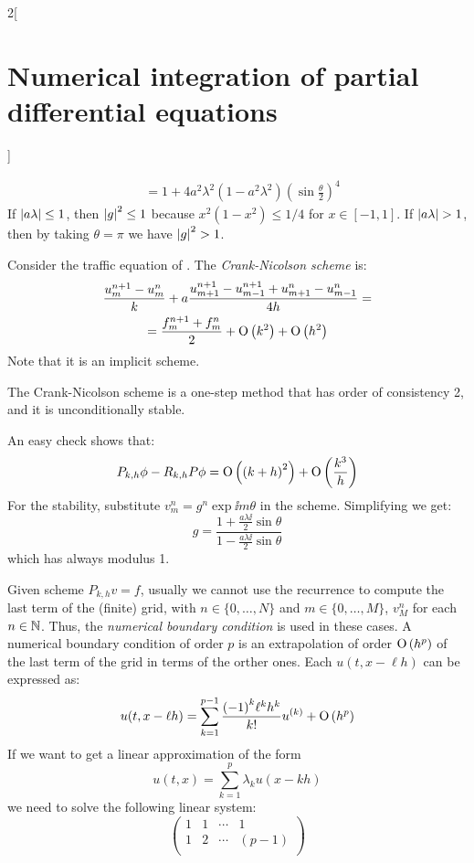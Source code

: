 \documentclass[../../../main_math.tex]{subfiles}
\begin{document}
\begin{multicols}{2}[\section{Numerical integration of partial differential equations}]
\begin{sproof}
\begin{align*}
       & =1+4a^2\lambda^2(1-a^2\lambda^2){\left(\sin\frac{\theta}{2}\right)}^4
    \end{align*}
    If $\abs{a\lambda}\leq 1$, then $\abs{g}^2 \leq 1$ because $x^2(1-x^2)\leq 1/4$ for $x\in[-1,1]$. If $\abs{a\lambda}>1$, then by taking $\theta=\pi$ we have $\abs{g}^2>1$.
  \end{sproof}
  \begin{proposition}
    Consider the traffic equation of .
    The \emph{Crank-Nicolson scheme} is:
    \begin{multline*}
      \frac{u_m^{n+1}-u_{m}^n}{k}+a\frac{u_{m+1}^{n+1}-u_{m-1}^{n+1}+u_{m+1}^{n}-u_{m-1}^{n}}{4h}=\\ =\frac{f_m^{n+1}+f_m^n}{2}+\mathrm{O}\left(k^2\right)+\mathrm{O}\left(h^2\right)
    \end{multline*}
    Note that it is an implicit scheme.
  \end{proposition}
  \begin{proposition}
    The Crank-Nicolson scheme is a one-step method that has order of consistency 2, and it is unconditionally stable.
  \end{proposition}
  \begin{sproof}
    An easy check shows that:
    $$P_{k,h}\phi-R_{k,h}P\phi=\O{{(k+h)}^2}+\O{\frac{k^3}{h}}$$
    For the stability, substitute $v_m^n=g^n\exp{\ii m\theta}$ in the scheme. Simplifying we get:
    $$
      g=\frac{1+\frac{a\lambda\ii}{2}\sin\theta}{1-\frac{a\lambda\ii}{2}\sin\theta}
    $$
    which has always modulus 1.
  \end{sproof}
  \begin{definition}
    Given scheme $P_{k,h}{v}={f}$, usually we cannot use the recurrence to compute the last term of the (finite) grid, with $n\in\{0,\ldots,N\}$ and $m\in\{0,\ldots,M\}$, $v_M^{n}$ for each $n\in\NN$. Thus, the \emph{numerical boundary condition} is used in these cases. A numerical boundary condition of order $p$ is an extrapolation of order $\O{h^p}$ of the last term of the grid in terms of the orther ones. Each $u(t,x-\ell h)$ can be expressed as: $$u(t,x-\ell h)=\sum_{k=1}^{p-1}\frac{{(-1)}^k \ell^kh^k}{k!}u^{(k)}+\O{h^p}$$
    If we want to get a linear approximation of the form
    $$u(t,x)=\sum_{k=1}^{p}\lambda_ku(x-kh)$$
    we need to solve the following linear system:
    $$
      \begin{pmatrix}
        1      & 1       & \cdots & 1             \\
        1      & 2       & \cdots & {(p-1)}       \\

\end{pmatrix}$$
\end{definition}
\end{multicols}
\end{document}
